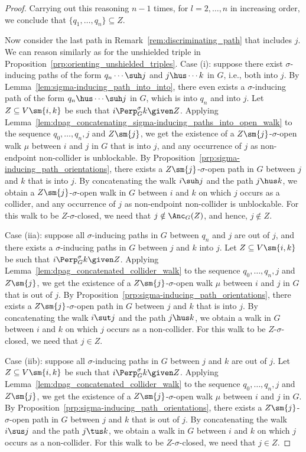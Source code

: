 \begin{proof}
  Carrying out this reasoning $n-1$ times, for $l = 2, \dots, n$ in increasing order, we conclude that $\{q_1,\dots,q_n\} \subseteq Z$.

  Now consider the last path in Remark~\ref{rem:discriminating_path} that includes $j$. 
  We can reason similarly as for the unshielded triple in Proposition~\ref{prp:orienting_unshielded_triples}.
  Case (i): suppose there exist $\sigma$-inducing paths of the form $q_n \cdots \suh j$ and $j \hus \cdots k$ in $G$, i.e., both into $j$. 
  By Lemma~\ref{lem:sigma-inducing_path_into_into}, there even exists a $\sigma$-inducing path of the form $q_n \hus \cdots \suh j$ in $G$, which is into $q_n$ and into $j$.
  Let $Z \subseteq V \sm \{i,k\}$ be such that $i \Perp^\sigma_G k \given Z$.
  Applying Lemma~\ref{lem:dpag_concatenating_sigma-inducing_paths_into_open_walk} to the sequence $q_0,\dots,q_n,j$ and $Z\sm\{j\}$, we get the existence of a $Z\sm\{j\}$-$\sigma$-open walk $\mu$ between $i$ and $j$ in $G$ that is into $j$, and any occurrence of $j$ as non-endpoint non-collider is unblockable.
  By Proposition~\ref{prp:sigma-inducing_path_orientations}, there exists a $Z \sm \{j\}$-$\sigma$-open path in $G$ between $j$ and $k$ that is into $j$.
  By concatenating the walk $i \suh j$ and the path $j \hus k$, we obtain a $Z \sm \{j\}$-$\sigma$-open walk in $G$ between $i$ and $k$ on which $j$ occurs as a collider, and any occurrence of $j$ as non-endpoint non-collider is unblockable.
  For this walk to be $Z$-$\sigma$-closed, we need that $j \notin \Anc_G(Z)$, and hence, $j \notin Z$.

  Case (iia): suppose all $\sigma$-inducing paths in $G$ between $q_n$ and $j$ are out of $j$, and there exists a $\sigma$-inducing paths in $G$ between $j$ and $k$ into $j$.
  Let $Z \subseteq V \sm \{i,k\}$ be such that $i \Perp^\sigma_G k \given Z$.
  Applying Lemma~\ref{lem:dpag_concatenated_collider_walk} to the sequence $q_0,\dots,q_n,j$ and $Z\sm\{j\}$, we get the existence of a $Z\sm\{j\}$-$\sigma$-open walk $\mu$ between $i$ and $j$ in $G$ that is out of $j$.
  By Proposition~\ref{prp:sigma-inducing_path_orientations}, there exists a $Z \sm \{j\}$-$\sigma$-open path in $G$ between $j$ and $k$ that is into $j$.
  By concatenating the walk $i \sut j$ and the path $j \hus k$, we obtain a walk in $G$ between $i$ and $k$ on which $j$ occurs as a non-collider.
  For this walk to be $Z$-$\sigma$-closed, we need that $j \in Z$.

  Case (iib): suppose all $\sigma$-inducing paths in $G$ between $j$ and $k$ are out of $j$.
  Let $Z \subseteq V \sm \{i,k\}$ be such that $i \Perp^\sigma_G k \given Z$.
  Applying Lemma~\ref{lem:dpag_concatenated_collider_walk} to the sequence $q_0,\dots,q_n,j$ and $Z\sm\{j\}$, we get the existence of a $Z\sm\{j\}$-$\sigma$-open walk $\mu$ between $i$ and $j$ in $G$.
  By Proposition~\ref{prp:sigma-inducing_path_orientations}, there exists a $Z \sm \{j\}$-$\sigma$-open path in $G$ between $j$ and $k$ that is out of $j$.
  By concatenating the walk $i \sus j$ and the path $j \tus k$, we obtain a walk in $G$ between $i$ and $k$ on which $j$ occurs as a non-collider.
  For this walk to be $Z$-$\sigma$-closed, we need that $j \in Z$.


\end{proof}
